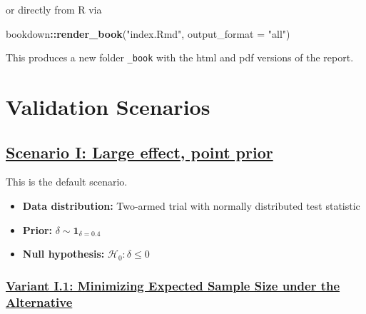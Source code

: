 \documentclass[
]{book}
\newenvironment{Shaded}{\begin{snugshade}}{\end{snugshade}}
\newcommand{\DataTypeTok}[1]{\textcolor[rgb]{0.13,0.29,0.53}{#1}}
\newcommand{\KeywordTok}[1]{\textcolor[rgb]{0.13,0.29,0.53}{\textbf{#1}}}
\newcommand{\NormalTok}[1]{#1}
\newcommand{\OperatorTok}[1]{\textcolor[rgb]{0.81,0.36,0.00}{\textbf{#1}}}
\newcommand{\StringTok}[1]{\textcolor[rgb]{0.31,0.60,0.02}{#1}}
\providecommand{\tightlist}{%
  \setlength{\itemsep}{0pt}\setlength{\parskip}{0pt}}
\begin{document}
or directly from R via

\begin{Shaded}
\begin{Highlighting}[]
\NormalTok{bookdown}\OperatorTok{::}\KeywordTok{render_book}\NormalTok{(}\StringTok{"index.Rmd"}\NormalTok{, }\DataTypeTok{output_format =} \StringTok{"all"}\NormalTok{)}
\end{Highlighting}
\end{Shaded}

This produces a new folder \texttt{\_book} with the html and pdf versions
of the report.

\hypertarget{validation-scenarios}{%
\section{Validation Scenarios}\label{validation-scenarios}}

\hypertarget{scenario-i-large-effect-point-prior}{%
\subsection{\texorpdfstring{\protect\hyperlink{scenarioI}{Scenario I: Large effect, point prior}}{Scenario I: Large effect, point prior}}\label{scenario-i-large-effect-point-prior}}

This is the default scenario.

\begin{itemize}
\tightlist
\item
  \textbf{Data distribution:} Two-armed trial with normally distributed test statistic
\item
  \textbf{Prior:} \(\delta\sim\textbf{1}_{\delta=0.4}\)
\item
  \textbf{Null hypothesis:} \(\mathcal{H}_0:\delta \leq 0\)
\end{itemize}

\hypertarget{variant-i.1-minimizing-expected-sample-size-under-the-alternative}{%
\subsubsection{\texorpdfstring{\protect\hyperlink{variantI_1}{Variant I.1: Minimizing Expected Sample Size under the Alternative}}{Variant I.1: Minimizing Expected Sample Size under the Alternative}}\label{variant-i.1-minimizing-expected-sample-size-under-the-alternative}}
\end{document}
